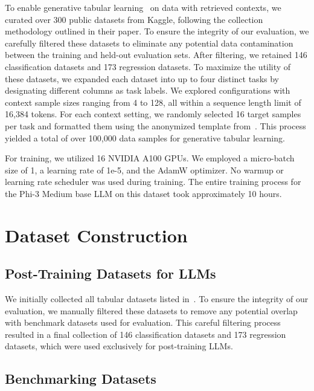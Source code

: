 To enable generative tabular learning~\citep{wen2024GTL} on data with retrieved contexts, we curated over 300 public datasets from Kaggle, following the collection methodology outlined in their paper. To ensure the integrity of our evaluation, we carefully filtered these datasets to eliminate any potential data contamination between the training and held-out evaluation sets. After filtering, we retained 146 classification datasets and 173 regression datasets. To maximize the utility of these datasets, we expanded each dataset into up to four distinct tasks by designating different columns as task labels. We explored configurations with context sample sizes ranging from 4 to 128, all within a sequence length limit of 16,384 tokens. For each context setting, we randomly selected 16 target samples per task and formatted them using the anonymized template from~\citep{wen2024GTL}. This process yielded a total of over 100,000 data samples for generative tabular learning.

For training, we utilized 16 NVIDIA A100 GPUs. We employed a micro-batch size of 1, a learning rate of 1e-5, and the AdamW optimizer. No warmup or learning rate scheduler was used during training. The entire training process for the Phi-3 Medium base LLM on this dataset took approximately 10 hours.

\section{Dataset Construction}
\label{app:data_constr}

\subsection{Post-Training Datasets for LLMs}
\label{app:data_constr_train}

We initially collected all tabular datasets listed in~\citep{wen2024GTL}. To ensure the integrity of our evaluation, we manually filtered these datasets to remove any potential overlap with benchmark datasets used for evaluation. This careful filtering process resulted in a final collection of 146 classification datasets and 173 regression datasets, which were used exclusively for post-training LLMs.

\subsection{Benchmarking Datasets}
\label{app:data_constr_eval}

